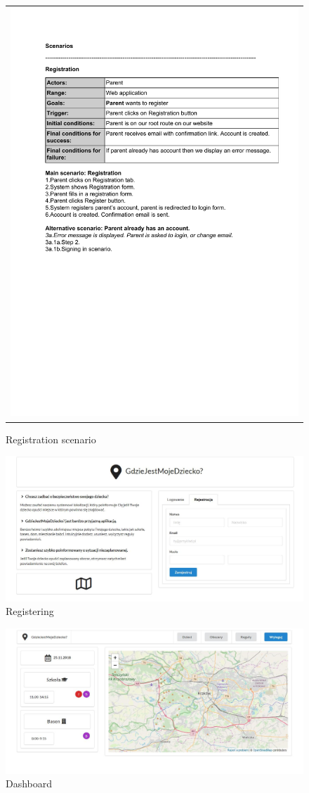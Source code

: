 \documentclass{sprawozdanie-agh}
\begin{document}
    	\begin{figure}[H]
    		\centering
    		\begin{tabular}{c}
    			\includegraphics[width=.80\textwidth]{reg_cropped}
    		\end{tabular}
    		\caption{Registration scenario}
    	\end{figure}

    	\begin{figure}[H]
    		\centering
    		\includegraphics[width=.80\textwidth]{register}
    		\caption{Registering}
    	\end{figure}

    	\begin{figure}[H]
    		\centering
    		\includegraphics[width=.80\textwidth]{dashboard}
    		\caption{Dashboard}
    	\end{figure}
\end{document}
